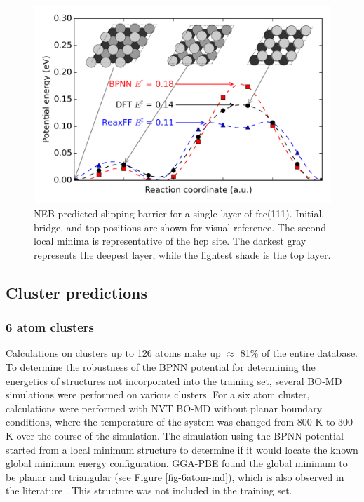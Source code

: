 \documentclass[12pt]{cmuthesis}
\begin{document}
\begin{figure}[h]
\centering
\includegraphics[width=5in]{./images/fig-111-slipping.png}
\caption{\label{fig-111-slipping}
NEB predicted slipping barrier for a single layer of fcc(111). Initial, bridge, and top positions are shown for visual reference. The second local minima is representative of the hcp site. The darkest gray represents the deepest layer, while the lightest shade is the top layer.}
\end{figure}
\subsection{Cluster predictions}
\label{sec:org8862596}
\subsubsection{6 atom clusters}
\label{sec:org04a3472}
Calculations on clusters up to 126 atoms make up \(\approx\) 81\% of the entire database. To determine the robustness of the BPNN potential for determining the energetics of structures not incorporated into the training set, several BO-MD simulations were performed on various clusters. For a six atom cluster, calculations were performed with NVT BO-MD without planar boundary conditions, where the temperature of the system was changed from 800 K to 300 K over the course of the simulation. The simulation using the BPNN potential started from a local minimum structure to determine if it would locate the known global minimum energy configuration. GGA-PBE found the global minimum to be planar and triangular (see Figure \ref{fig-6atom-md}), which is also observed in the literature \cite{phaisangittisakul-2012-stabl}. This structure was not included in the training set.
\end{document}
